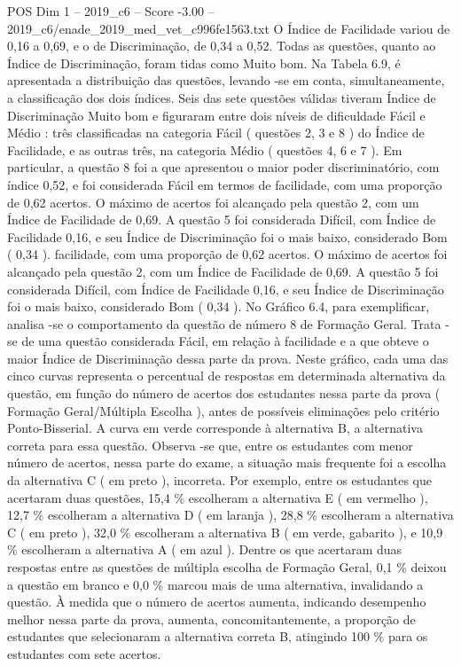 \begin{textsample}{POS Dim 1 – 2019\_c6 – Score -3.00 – 2019\_c6/enade\_2019\_med\_vet\_c996fe1563.txt}
O Índice de Facilidade variou de 0,16 a 0,69, e o de Discriminação, de 0,34 a 0,52.
Todas as questões, quanto ao Índice de Discriminação, foram tidas como Muito bom.
Na Tabela 6.9, é apresentada a distribuição das questões, levando -se em conta, simultaneamente, a classificação dos dois índices.
Seis das sete questões válidas tiveram Índice de Discriminação Muito bom e figuraram entre dois níveis de dificuldade Fácil e Médio : três classificadas na categoria Fácil ( questões 2, 3 e 8 ) do Índice de Facilidade, e as outras três, na categoria Médio ( questões 4, 6 e 7 ).
Em particular, a questão 8 foi a que apresentou o maior poder discriminatório, com índice 0,52, e foi considerada Fácil em termos de facilidade, com uma proporção de 0,62 acertos.
O máximo de acertos foi alcançado pela questão 2, com um Índice de Facilidade de 0,69.
A questão 5 foi considerada Difícil, com Índice de Facilidade 0,16, e seu Índice de Discriminação foi o mais baixo, considerado Bom ( 0,34 ). facilidade, com uma proporção de 0,62 acertos.
O máximo de acertos foi alcançado pela questão 2, com um Índice de Facilidade de 0,69.
A questão 5 foi considerada Difícil, com Índice de Facilidade 0,16, e seu Índice de Discriminação foi o mais baixo, considerado Bom ( 0,34 ).
No Gráfico 6.4, para exemplificar, analisa -se o comportamento da questão de número 8 de Formação Geral.
Trata -se de uma questão considerada Fácil, em relação à facilidade e a que obteve o maior Índice de Discriminação dessa parte da prova.
Neste gráfico, cada uma das cinco curvas representa o percentual de respostas em determinada alternativa da questão, em função do número de acertos dos estudantes nessa parte da prova ( Formação Geral/Múltipla Escolha ), antes de possíveis eliminações pelo critério Ponto-Bisserial.
A curva em verde corresponde à alternativa B, a alternativa correta para essa questão.
Observa -se que, entre os estudantes com menor número de acertos, nessa parte do exame, a situação mais frequente foi a escolha da alternativa C ( em preto ), incorreta.
Por exemplo, entre os estudantes que acertaram duas questões, 15,4 \% escolheram a alternativa E ( em vermelho ), 12,7 \% escolheram a alternativa D ( em laranja ), 28,8 \% escolheram a alternativa C ( em preto ), 32,0 \% escolheram a alternativa B ( em verde, gabarito ), e 10,9 \% escolheram a alternativa A ( em azul ).
Dentre os que acertaram duas respostas entre as questões de múltipla escolha de Formação Geral, 0,1 \% deixou a questão em branco e 0,0 \% marcou mais de uma alternativa, invalidando a questão.
À medida que o número de acertos aumenta, indicando desempenho melhor nessa parte da prova, aumenta, concomitantemente, a proporção de estudantes que selecionaram a alternativa correta B, atingindo 100 \% para os estudantes com sete acertos.

\end{textsample}

